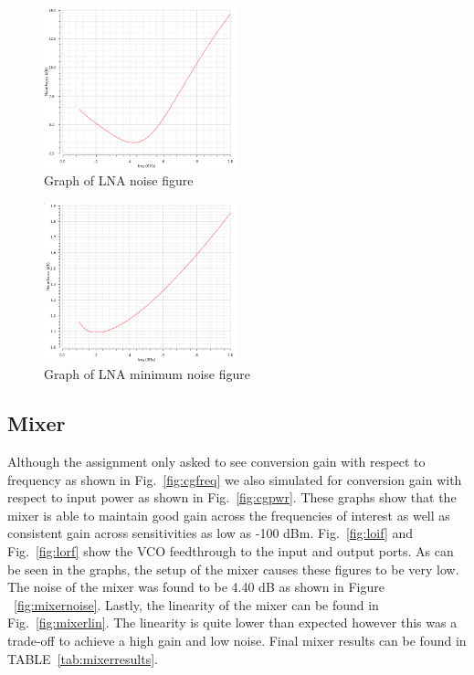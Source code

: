 \begin{figure}[H]
   \centering
    \includegraphics[width=0.5\textwidth]{figures/lnanoise.png}
    \caption{Graph of LNA noise figure}
    \label{fig:lnanoise}
\end{figure}

\begin{figure}[H]
   \centering
    \includegraphics[width=0.5\textwidth]{figures/lnanoisemin.png}
    \caption{Graph of LNA minimum noise figure}
    \label{fig:lnanoisemin}
\end{figure}

\subsection{Mixer}
Although the assignment only asked to see conversion gain with respect to frequency as shown in Fig.~\ref{fig:cgfreq} we also simulated for conversion gain with respect to input power as shown in Fig.~\ref{fig:cgpwr}. These graphs show that the mixer is able to maintain good gain across the frequencies of interest as well as consistent gain across sensitivities as low as -100 dBm. Fig.~\ref{fig:loif} and Fig.~\ref{fig:lorf} show the VCO feedthrough to the input and output ports. As can be seen in the graphs, the setup of the mixer causes these figures to be very low. The noise of the mixer was found to be 4.40 dB as shown in Figure ~\ref{fig:mixernoise}. Lastly, the linearity of the mixer can be found in Fig.~\ref{fig:mixerlin}. The linearity is quite lower than expected however this was a trade-off to achieve a high gain and low noise. Final mixer results can be found in TABLE~\ref{tab:mixerresults}.

